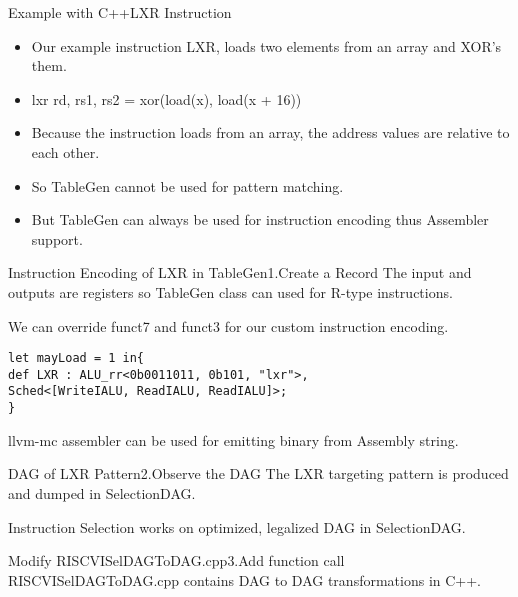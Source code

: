 \begin{frame}{Example with C++}{LXR Instruction}
\begin{itemize}
    \item Our example instruction LXR, loads two elements from an array and XOR's them.
    \item lxr rd, rs1, rs2 = xor(load(x), load(x + 16))

    \item Because the instruction loads from an array, the address values are relative to each other. 
    \item So TableGen cannot be used for pattern matching.
    \item But TableGen can always be used for instruction encoding thus Assembler support.
\end{itemize}
\end{frame}

\begin{frame}[fragile]{Instruction Encoding of LXR in TableGen}{1.Create a Record}
The input and outputs are registers so TableGen class can used for R-type instructions.

We can override funct7 and funct3 for our custom instruction encoding.
\begin{lstlisting}
let mayLoad = 1 in{
def LXR : ALU_rr<0b0011011, 0b101, "lxr">,
Sched<[WriteIALU, ReadIALU, ReadIALU]>;
}
\end{lstlisting}
llvm-mc assembler can be used for emitting binary from Assembly string.
\end{frame}

\begin{frame}[fragile]{DAG of LXR Pattern}{2.Observe the DAG}
The LXR targeting pattern is produced and dumped in SelectionDAG.

Instruction Selection works on optimized, legalized DAG in SelectionDAG.
\end{frame}

\begin{frame}[fragile]{Modify RISCVISelDAGToDAG.cpp}{3.Add function call}
    RISCVISelDAGToDAG.cpp contains DAG to DAG transformations in C++.

\end{frame}


